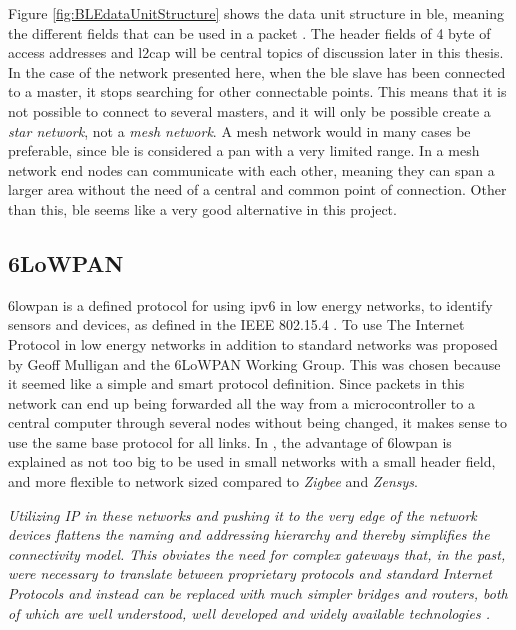 \noindent Figure \ref{fig:BLEdataUnitStructure} shows the data unit structure in \gls{ble}, meaning the different fields that can be used in a packet \cite{gomez2012overview}. The header fields of 4 \gls{byte} of access addresses and \gls{l2cap} will be central topics of discussion later in this thesis. In the case of the network presented here, when the \gls{ble} slave has been connected to a master, it stops searching for other connectable points. This means that it is not possible to connect to several masters, and it will only be possible create a \textit{star network}, not a \textit{mesh network}. A mesh network would in many cases be preferable, since \gls{ble} is considered a \gls{pan} with a very limited range. In a mesh network end nodes can communicate with each other, meaning they can span a larger area without the need of a central and common point of connection. Other than this, \gls{ble} seems like a very good alternative in this project. 


\subsection{6LoWPAN}

\noindent \gls{6lowpan} is a defined protocol for using \gls{ipv6} in low energy networks, to identify sensors and devices, as defined in the IEEE 802.15.4 . To use The Internet Protocol in low energy networks in addition to standard networks was proposed by Geoff Mulligan and the 6LoWPAN Working Group. This was chosen because it seemed like a simple and smart protocol definition. Since packets in this network can end up being forwarded all the way from a \gls{microcontroller} to a central computer through several nodes without being changed, it makes sense to use the same base protocol for all links. In \cite{mulligan20076lowpan}, the advantage of \gls{6lowpan} is explained as not too big to be used in small networks with a small header field, and more flexible to network sized compared to \textit{Zigbee} and \textit{Zensys}. 

\noindent\textit{Utilizing IP  in these networks and pushing it to the very edge of the network devices flattens the naming and addressing hierarchy and  thereby  simplifies  the  connectivity  model. This obviates the need  for  complex  gateways  that,  in  the  past,  were  necessary  to translate   between   proprietary   protocols   and   standard   Internet Protocols and instead can be replaced with much simpler bridges and  routers,  both  of  which  are  well  understood, well  developed and  widely  available  technologies \cite{mulligan20076lowpan}.}


